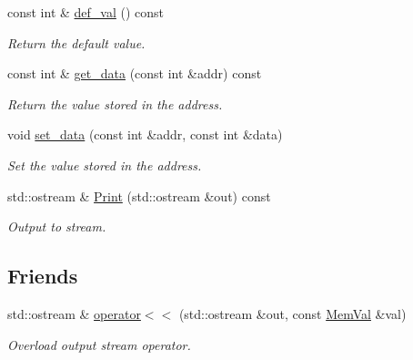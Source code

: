 \begin{DoxyCompactItemize}
\mbox{\label{classilang_1_1_mem_val_a6ef1149c0c760c669ba4e3b99effbb73}} 
const int \& \mbox{\hyperlink{classilang_1_1_mem_val_a6ef1149c0c760c669ba4e3b99effbb73}{def\+\_\+val}} () const
\begin{DoxyCompactList}\small\item\em Return the default value. \end{DoxyCompactList}\item 
\mbox{\label{classilang_1_1_mem_val_accf0c51234c8b6840e6289a2964b8de3}} 
const int \& \mbox{\hyperlink{classilang_1_1_mem_val_accf0c51234c8b6840e6289a2964b8de3}{get\+\_\+data}} (const int \&addr) const
\begin{DoxyCompactList}\small\item\em Return the value stored in the address. \end{DoxyCompactList}\item 
\mbox{\label{classilang_1_1_mem_val_a4ee6ea9f32cf712b8bece114392d8d73}} 
void \mbox{\hyperlink{classilang_1_1_mem_val_a4ee6ea9f32cf712b8bece114392d8d73}{set\+\_\+data}} (const int \&addr, const int \&data)
\begin{DoxyCompactList}\small\item\em Set the value stored in the address. \end{DoxyCompactList}\item 
\mbox{\label{classilang_1_1_mem_val_a66dd527af9616d242728c5e04cd655e9}} 
std\+::ostream \& \mbox{\hyperlink{classilang_1_1_mem_val_a66dd527af9616d242728c5e04cd655e9}{Print}} (std\+::ostream \&out) const
\begin{DoxyCompactList}\small\item\em Output to stream. \end{DoxyCompactList}\end{DoxyCompactItemize}
\subsection*{Friends}
\begin{DoxyCompactItemize}
\item 
\mbox{\label{classilang_1_1_mem_val_ad3c0a22c04e05b8eba38fde2a126f7dd}} 
std\+::ostream \& \mbox{\hyperlink{classilang_1_1_mem_val_ad3c0a22c04e05b8eba38fde2a126f7dd}{operator$<$$<$}} (std\+::ostream \&out, const \mbox{\hyperlink{classilang_1_1_mem_val}{Mem\+Val}} \&val)
\begin{DoxyCompactList}\small\item\em Overload output stream operator. \end{DoxyCompactList}\end{DoxyCompactItemize}


